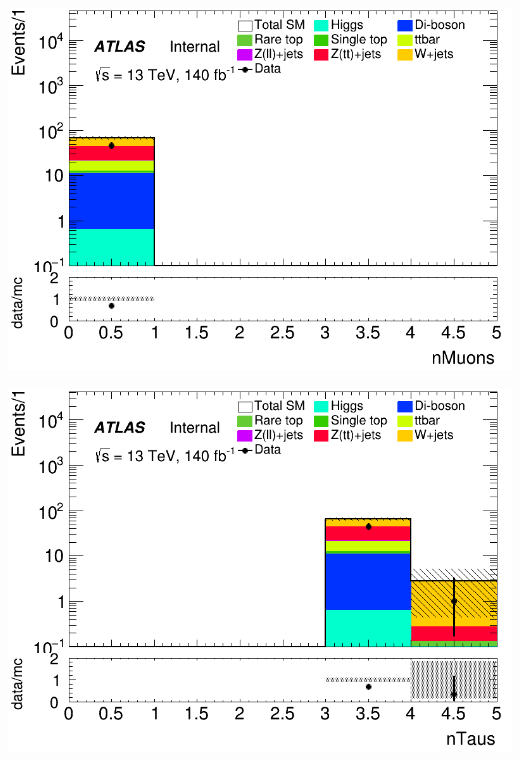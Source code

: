 \documentclass[usenames,dvipsnames]{beamer}
\begin{document}
\begin{frame}
    \begin{minipage}{0.32\textwidth}
        \centering
        \includegraphics[width=\textwidth]{graphics/HHH_met/HHH_met_nMuons.png}
    \end{minipage}
    \hfill
    \begin{minipage}{0.32\textwidth}
        \centering
        \includegraphics[width=\textwidth]{graphics/HHH_met/HHH_met_nTaus.png}
    \end{minipage}
    \hfill
    \begin{minipage}{0.32\textwidth}
        \centering

\end{minipage}
\end{frame}
\end{document}
